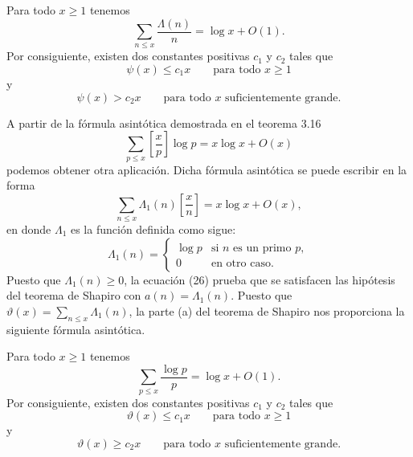 \documentclass[12pt,a4paper]{book}
\begin{document}
    \begin{teorema}
        Para todo $x\geq1$ tenemos
        \begin{equation}
            \sum_{n\leq x}\frac{\Lambda(n)}{n}=\log x+O(1).
        \end{equation}
        Por consiguiente, existen dos constantes positivas $c_1$ y $c_2$ tales que
        \begin{equation*}
            \psi(x)\leq c_1x\qquad\text{para todo } x\geq1
        \end{equation*}
        y
        \begin{equation*}
            \psi(x)>c_2x\qquad\text{para todo } x \text{ suficientemente grande.}
        \end{equation*}
    \end{teorema}

    A partir de la fórmula asintótica demostrada en el teorema 3.16
    \begin{equation*}
        \sum_{p\leq x}\left[\frac{x}{p}\right]\log p=x\log x+O(x)
    \end{equation*}
    podemos obtener otra aplicación. Dicha fórmula asintótica se puede escribir en la
    forma
    \begin{equation}
        \sum_{n\leq x}\Lambda_1(n)\left[\frac{x}{n}\right]=x\log x+O(x),
    \end{equation}
    en donde $\Lambda_1$ es la función definida como sigue:
    \begin{equation*}
        \Lambda_1(n)=
        \begin{cases}
            \log p & \text{si } n \text{ es un primo } p,\\
            0 & \text{en otro caso.}
        \end{cases}
    \end{equation*}
    Puesto que $\Lambda_1(n)\geq0$, la ecuación (26) prueba que se satisfacen las
    hipótesis del teorema de Shapiro con $a(n)=\Lambda_1(n)$. Puesto que
    $\vartheta(x)=\sum_{n\leq x}\Lambda_1(n)$, la parte (a) del teorema de Shapiro nos
    proporciona la siguiente fórmula asintótica.

    \begin{teorema}
        Para todo $x\geq1$ tenemos
        \begin{equation}
            \sum_{p\leq x}\frac{\log p}{p}=\log x+O(1).
        \end{equation}
        Por consiguiente, existen dos constantes positivas $c_1$ y $c_2$ tales que
        \begin{equation*}
            \vartheta(x)\leq c_1x\qquad\text{para todo } x\geq1
        \end{equation*}
        y
        \begin{equation*}
            \vartheta(x)\geq c_2x\qquad\text{para todo } x \text{ suficientemente grande.}
        \end{equation*}
    \end{teorema}
\end{document}
